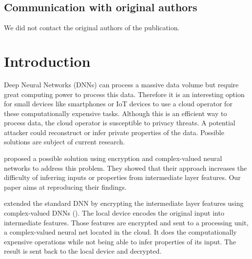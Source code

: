 \subsection*{Communication with original authors}

We did not contact the original authors of the publication.


\newpage
\section{Introduction}

Deep Neural Networks (DNNs) can process a massive data volume but require great computing power to process this data. Therefore it is an interesting option for small devices like smartphones or IoT devices to use a cloud operator for these computationally expensive tasks. Although this is an efficient way to process data, the cloud operator is susceptible to privacy threats. A potential attacker could reconstruct or infer private properties of the data. Possible solutions are subject of current research.

\citet{xiang2020interpretable} proposed a possible solution using encryption and complex-valued neural networks to address this problem. They showed that their approach increases the difficulty of inferring inputs or properties from intermediate layer features. Our paper aims at reproducing their findings.

 \citet{xiang2020interpretable} extended the standard DNN by encrypting the intermediate layer features using complex-valued DNNs (\citet{DBLP:journals/corr/TrabelsiBSSSMRB17}). The local device encodes the original input into intermediate features. Those features are encrypted and sent to a processing unit, a complex-valued neural net located in the cloud. It does the computationally expensive operations while not being able to infer properties of its input. The result is sent back to the local device and decrypted.
 
